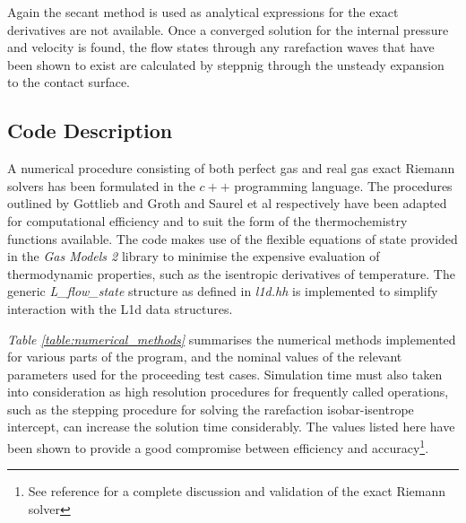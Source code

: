 \documentclass[a4paper,10pt]{article}
\begin{document}
Again the secant method is used as analytical expressions for the exact derivatives are not available.  Once a converged solution for the internal pressure and velocity is found, the flow states through any rarefaction waves that have been shown to exist are calculated by steppnig through the unsteady expansion to the contact surface.  

\subsection{Code Description}

A numerical procedure consisting of both perfect gas and real gas exact Riemann solvers has been formulated in the $c++$ programming language.  The procedures outlined by Gottlieb and Groth \cite{gottlieb} and Saurel et al \cite{saurel} respectively have been adapted for computational efficiency and to suit the form of the thermochemistry functions available. The code makes use of the flexible equations of state provided in the \emph{Gas Models 2} library to minimise the expensive evaluation of thermodynamic properties, such as the isentropic derivatives of temperature.  The generic \emph{L\_flow\_state} structure as defined in \emph{l1d.hh} is implemented to simplify interaction with the L1d data structures. 

\par
\medskip

\emph{Table \ref{table:numerical_methods}} summarises the numerical methods implemented for various parts of the program, and the nominal values of the relevant parameters used for the proceeding test cases.  Simulation time must also taken into consideration as high resolution procedures for frequently called operations, such as the stepping procedure for solving the rarefaction isobar-isentrope intercept, can increase the solution time considerably.  The values listed here have been shown to provide a good compromise between efficiency and accuracy\footnote{See reference \cite{my_ug_thesis} for a complete discussion and validation of the exact Riemann solver}.
\end{document}
